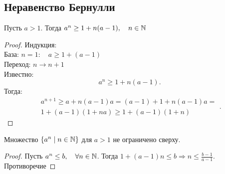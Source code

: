 \documentclass[12pt]{report}
\begin{document}
\subsection{Неравенство Бернулли}\label{ques_3}
\begin{thm}
    Пусть $a>1$. Тогда $a^n \ge 1 + n(a-1), \quad n \in \mathbb{N}$
\end{thm}
\begin{proof}
    Индукция:\\
    База: $n = 1: \quad a \ge 1 + (a - 1)$\\
    Переход: $n \to n+1$ \\
    Известно: \[
	a^n \ge 1 +n(a-1)
    .\] 
    Тогда: 
   \[
       \begin{array}{c}
       a^{n+1} \ge a + n(a-1)a = (a-1) + 1 + n(a-1)a =\\
       1 + (a-1)(1+na) \ge 1+ (a-1)(1+n)
       \end{array}
   .\] 
\end{proof}
\begin{cor}
    Множество $\{a^n \mid n \in \mathbb{N}\}$ для $a > 1$ не ограничено сверху.
\end{cor}
\begin{proof}
    Пусть $a^n \le b, \quad \forall n \in \mathbb{N}$. Тогда $1 + (a-1)n \le b \Rightarrow n \le \frac{b-1}{a-1}$. Противоречие
\end{proof}
\end{document}
